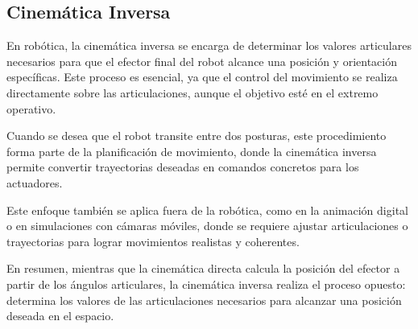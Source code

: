 \subsection{Cinemática Inversa}
En robótica, la cinemática inversa se encarga de determinar los valores articulares necesarios para que el efector final del robot alcance una posición y orientación específicas. Este proceso es esencial, ya que el control del movimiento se realiza directamente sobre las articulaciones, aunque el objetivo esté en el extremo operativo.

Cuando se desea que el robot transite entre dos posturas, este procedimiento forma parte de la planificación de movimiento, donde la cinemática inversa permite convertir trayectorias deseadas en comandos concretos para los actuadores.

Este enfoque también se aplica fuera de la robótica, como en la animación digital o en simulaciones con cámaras móviles, donde se requiere ajustar articulaciones o trayectorias para lograr movimientos realistas y coherentes.

En resumen, mientras que la cinemática directa calcula la posición del efector a partir de los ángulos articulares, la cinemática inversa realiza el proceso opuesto: determina los valores de las articulaciones necesarios para alcanzar una posición deseada en el espacio.

